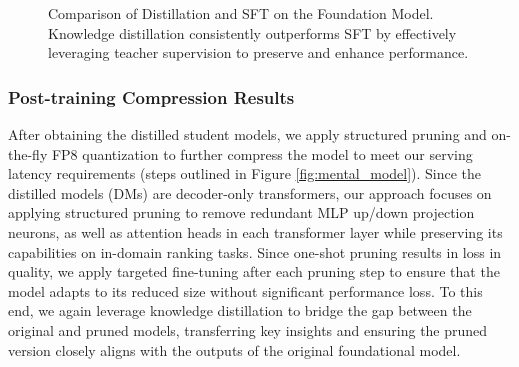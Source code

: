 \begin{figure}[t]
    \centering
{}
    \caption{Comparison of Distillation and SFT on the Foundation Model. Knowledge distillation consistently outperforms SFT by effectively leveraging teacher supervision to preserve and enhance performance.}
    \label{fig:distillation_sft_compare}
\end{figure}


\subsubsection{Post-training Compression Results}

After obtaining the distilled student models, we apply structured pruning and on-the-fly FP8 quantization to further compress the model to meet our serving latency requirements (steps outlined in Figure \ref{fig:mental_model}). Since the distilled models (DMs) are decoder-only transformers, our approach focuses on applying structured pruning to remove redundant MLP up/down projection neurons, as well as attention heads in each transformer layer while preserving its capabilities on in-domain ranking tasks. Since one-shot pruning results in loss in quality, we apply targeted fine-tuning after each pruning step to ensure that the model adapts to its reduced size without significant performance loss. To this end, we again leverage knowledge distillation to bridge the gap between the original and pruned models, transferring key insights and ensuring the pruned version closely aligns with the outputs of the original foundational model. 

